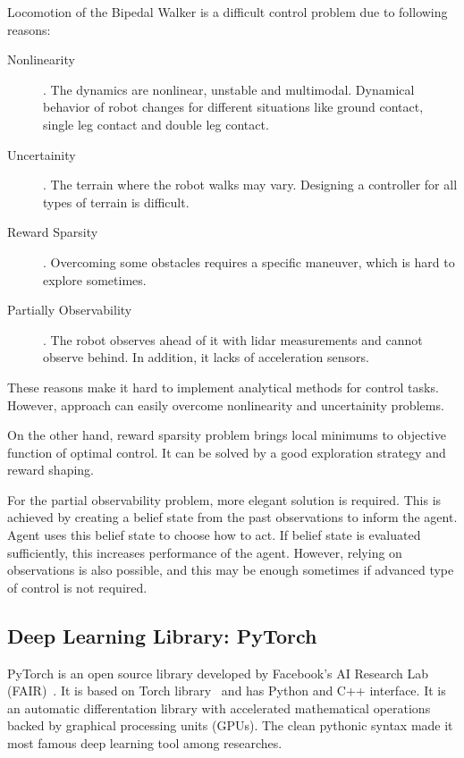 Locomotion of the Bipedal Walker is a difficult control problem due to following reasons: 
\begin{description}
	\item[Nonlinearity]. The dynamics are nonlinear, unstable and multimodal. 
	Dynamical behavior of robot changes for different situations 
	like ground contact, single leg contact and double leg contact.
	\item[Uncertainity]. The terrain where the robot walks may vary. 
	Designing a controller for all types of terrain is difficult.
	\item[Reward Sparsity]. Overcoming some obstacles requires a specific maneuver, which is hard to explore sometimes.	
	\item[Partially Observability]. The robot observes 
	ahead of it with lidar measurements and cannot observe behind. 
	In addition, it lacks of acceleration sensors.
\end{description}

These reasons make it hard to implement analytical methods for control tasks. 
However, approach can easily overcome nonlinearity and uncertainity problems.

On the other hand, reward sparsity problem brings local minimums to objective function of optimal control. It can be solved by a good exploration strategy and reward shaping. 

For the partial observability problem, more elegant solution is required. 
This is achieved by creating a belief state from the past observations to inform the agent. 
Agent uses this belief state to choose how to act. 
If belief state is evaluated sufficiently, 
this increases performance of the agent.
However, relying on observations is also possible, 
and this may be enough sometimes if advanced type of control is not required. 

\subsection{Deep Learning Library: PyTorch}
\label{dl_pytorch}
PyTorch is an open source library developed by Facebook's AI Research Lab (FAIR)~\cite{paszke_pytorch_2019}. 
It is based on Torch library~\cite{collobert_torch7_2011} and has Python and C++ interface. 
It is an automatic differentation library with accelerated mathematical operations backed by graphical processing units (GPUs). 
The clean pythonic syntax made it most famous deep learning tool among researches. 
